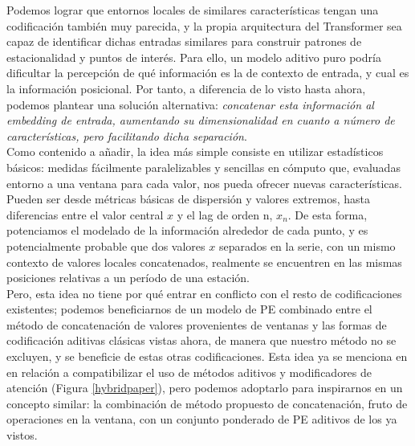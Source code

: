 Podemos lograr que entornos locales de similares características tengan una codificación también muy parecida, y la propia arquitectura del Transformer sea capaz de identificar dichas entradas similares para construir patrones de estacionalidad y puntos de interés. Para ello, un modelo aditivo puro podría dificultar la percepción de qué información es la de contexto de entrada, y cual es la información posicional. Por tanto, a diferencia de lo visto hasta ahora, podemos plantear una solución alternativa: \emph{concatenar esta información al embedding de entrada, aumentando su dimensionalidad en cuanto a número de características, pero facilitando dicha separación}.\\

Como contenido a añadir, la idea más simple consiste en utilizar estadísticos básicos: medidas fácilmente paralelizables y sencillas en cómputo que, evaluadas entorno a una ventana para cada valor, nos pueda ofrecer nuevas características. Pueden ser desde métricas básicas de dispersión y valores extremos, hasta diferencias entre el valor central $x$ y el lag de orden n, $x_n$. De esta forma, potenciamos el modelado de la información alrededor de cada punto, y es potencialmente probable que dos valores $x$ separados en la serie, con un mismo contexto de valores locales concatenados, realmente se encuentren en las mismas posiciones relativas a un período de una estación.\\

Pero, esta idea no tiene por qué entrar en conflicto con el resto de codificaciones existentes; podemos beneficiarnos de un modelo de PE combinado entre el método de concatenación de valores provenientes de ventanas y las formas de codificación aditivas clásicas vistas ahora, de manera que nuestro método no se excluyen, y se beneficie de estas otras codificaciones. Esta idea ya se menciona en \cite{irani2025positionalencodingtransformerbasedtime} en relación a compatibilizar el uso de métodos aditivos y modificadores de atención (Figura \ref{hybridpaper}), pero podemos adoptarlo para inspirarnos en un concepto similar: la combinación de método propuesto de concatenación, fruto de operaciones en la ventana, con un conjunto ponderado de PE aditivos de los ya vistos.\\

